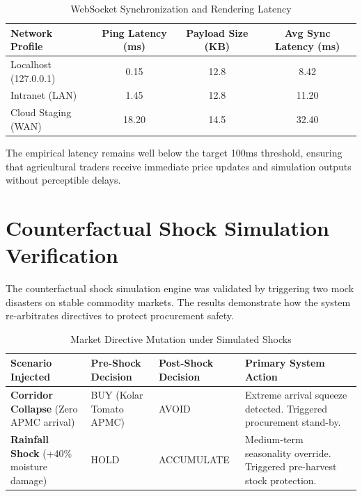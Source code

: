 \documentclass[12pt,a4paper]{report}
\begin{document}
\begin{table}[H]
\centering
\caption{WebSocket Synchronization and Rendering Latency}
\label{tab:websocket_latency}
\renewcommand{\arraystretch}{1.3}
\begin{tabular}{|l|c|c|c|}
\hline
\textbf{Network Profile} & \textbf{Ping Latency (ms)} & \textbf{Payload Size (KB)} & \textbf{Avg Sync Latency (ms)} \\
\hline
Localhost (127.0.0.1) & 0.15 & 12.8 & 8.42 \\
\hline
Intranet (LAN) & 1.45 & 12.8 & 11.20 \\
\hline
Cloud Staging (WAN) & 18.20 & 14.5 & 32.40 \\
\hline
\end{tabular}
\end{table}

The empirical latency remains well below the target 100ms threshold, ensuring that agricultural traders receive immediate price updates and simulation outputs without perceptible delays.

\section{Counterfactual Shock Simulation Verification}

The counterfactual shock simulation engine was validated by triggering two mock disasters on stable commodity markets. The results demonstrate how the system re-arbitrates directives to protect procurement safety.

\begin{table}[H]
\centering
\caption{Market Directive Mutation under Simulated Shocks}
\label{tab:simulated_shocks}
\renewcommand{\arraystretch}{1.3}
\setlength{\tabcolsep}{8pt}
\begin{tabular}{|p{3cm}|p{2.5cm}|p{2.5cm}|p{4.5cm}|}
\hline
\textbf{Scenario Injected} & \textbf{Pre-Shock Decision} & \textbf{Post-Shock Decision} & \textbf{Primary System Action} \\
\hline
\textbf{Corridor Collapse} (Zero APMC arrival) & BUY (Kolar Tomato APMC) & AVOID & Extreme arrival squeeze detected. Triggered procurement stand-by. \\
\hline
\textbf{Rainfall Shock} (+40\% moisture damage) & HOLD & ACCUMULATE & Medium-term seasonality override. Triggered pre-harvest stock protection. \\
\hline
\end{tabular}
\end{table}
\end{document}
